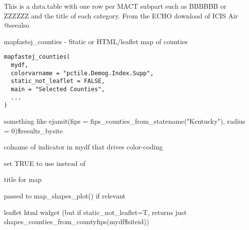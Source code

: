 \documentclass[a4paper]{book}
\begin{document}
%
\begin{Description}\relax
This is a data.table with one row per MACT subpart such as BBBBBB or ZZZZZZ
and the title of each category. From the ECHO download of ICIS Air
@seealso 
\end{Description}
%
\begin{Description}\relax
mapfastej\_counties - Static or HTML/leaflet map of counties
\end{Description}
%
\begin{Usage}
\begin{verbatim}
mapfastej_counties(
  mydf,
  colorvarname = "pctile.Demog.Index.Supp",
  static_not_leaflet = FALSE,
  main = "Selected Counties",
  ...
)
\end{verbatim}
\end{Usage}
%
\begin{Arguments}
\begin{ldescription}
\item[\code{mydf}] something like  ejamit(fips = fips\_counties\_from\_statename("Kentucky"), radius = 0)\$results\_bysite

\item[\code{colorvarname}] colname of indicator in mydf that drives color-coding

\item[\code{static\_not\_leaflet}] set TRUE to use  instead of 

\item[\code{main}] title for map

\item[\code{...}] passed to map\_shapes\_plot() if relevant
\end{ldescription}
\end{Arguments}
%
\begin{Value}
leaflet html widget (but if static\_not\_leaflet=T,
returns just shapes\_counties\_from\_countyfips(mydf\$siteid))
\end{Value}
%
\begin{Examples}
\end{Examples}
\end{document}
